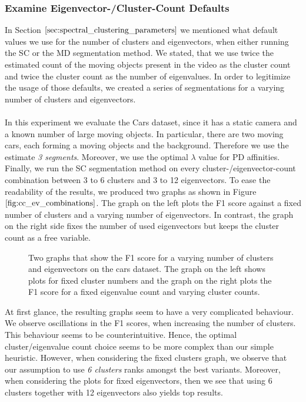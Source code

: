 \subsubsection{Examine Eigenvector-/Cluster-Count Defaults}
In Section $\ref{sec:spectral_clustering_parameters}$ we mentioned what default values we use for the number of clusters and eigenvectors, when either running the SC or the MD segmentation method. We stated, that we use twice the estimated count of the moving objects present in the video as the cluster count and twice the cluster count as the number of eigenvalues. In order to legitimize the usage of those defaults, we created a series of segmentations for a varying number of clusters and eigenvectors. \\ \\
In this experiment we evaluate the Cars dataset, since it has a static camera and a known number of large moving objects. In particular, there are two moving cars, each forming a moving objects and the background. Therefore we use the estimate \textit{3 segments}. Moreover, we use the optimal $\lambda$ value for PD affinities. Finally, we run the SC segmentation method on every cluster-/eigenvector-count combination between 3 to 6 clusters and 3 to 12 eigenvectors. To ease the readability of the results, we produced two graphs as shown in Figure $\ref{fig:cc_ev_combinations}$. The graph on the left plots the F1 score against a fixed number of clusters and a varying number of eigenvectors. In contrast, the graph on the right side fixes the number of used eigenvectors but keeps the cluster count as a free variable.
\begin{figure}[H]
\begin{center}
\end{center}
\caption[Varying number of Clusters / Eigenvectors]{Two graphs that show the F1 score for a varying number of clusters and eigenvectors on the cars dataset. The graph on the left shows plots for fixed cluster numbers and the graph on the right plots the F1 score for a fixed eigenvalue count and varying cluster counts.}
\label{fig:cc_ev_combinations}
\end{figure}
At first glance, the resulting graphs seem to have a very complicated behaviour. We observe oscillations in the F1 scores, when increasing the number of clusters. This behaviour seems to be counterintuitive. Hence, the optimal cluster/eigenvalue count choice seems to be more complex than our simple heuristic. However, when considering the fixed clusters graph, we observe that our assumption to use \textit{6 clusters} ranks amongst the best variants. Moreover, when considering the plots for fixed eigenvectors, then we see that using 6 clusters together with 12 eigenvectors also yields top results. \\ \\
